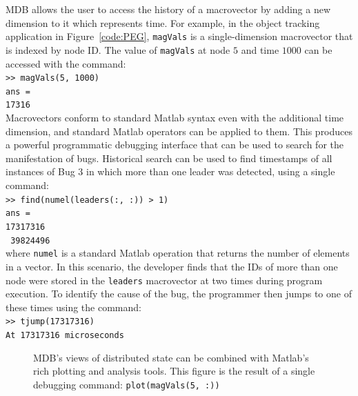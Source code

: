 MDB allows the user to access the history of a macrovector by adding a new
dimension to it which represents time. For example, in the object tracking
application in Figure~\ref{code:PEG}, {\tt magVals} is a single-dimension
macrovector that is indexed by node ID\@. The value of {\tt magVals} at node $5$
and time $1000$ can be accessed with the command:\\ {\small\indent\tt >>
magVals(5, 1000)}\\ {\small\indent\tt ans =}\\ {\small\indent\indent\tt 17316}\\
Macrovectors conform to standard Matlab syntax even with the additional time
dimension, and standard Matlab operators can be applied to them.  This produces
a powerful programmatic debugging interface that can be used to search for the
manifestation of bugs.  Historical search can be used to find timestamps of all
instances of Bug 3 in which more than one leader was detected, using a single
command: \\ {\small\indent\tt >> find(numel(leaders(:, :)) > 1)}\\
{\small\indent\tt ans =}\\ {\small\indent\indent\tt 17317316}\\
{\small\indent\indent\tt
39824496}\\
where {\tt numel} is a standard Matlab operation that returns the number of
elements in a vector.  In this scenario, the developer finds that the IDs of
more than one node were stored in the {\tt leaders} macrovector at two times
during program execution.  To identify the cause of the bug, the programmer then
jumps to one of these times using the command:\\ {\small\indent\tt >>
tjump(17317316)}\\
{\small\indent\tt At 17317316 microseconds}\\
\begin{figure}[t]
\caption[Example plot]{MDB's views of distributed state can be combined with Matlab's rich
  plotting and analysis tools.  This figure is the result of a single debugging
  command: {\tt plot(magVals(5, :))}}
\label{fig:examplePlot}
\end{figure}
